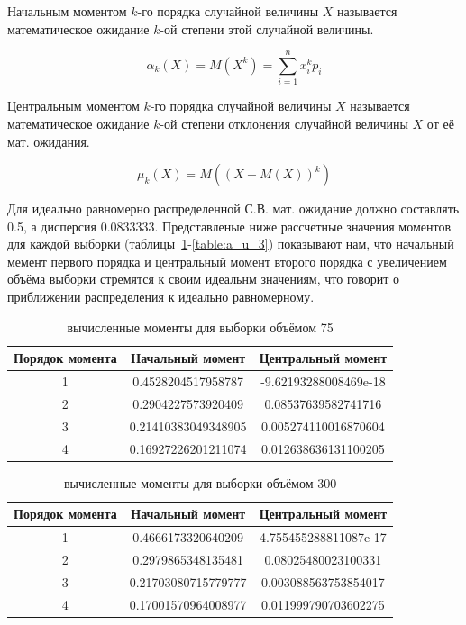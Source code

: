 \documentclass[a4paper,12pt]{article}
\begin{document}
Начальным моментом $k$-го порядка случайной величины $X$ называется математическое ожидание $k$-ой степени этой случайной величины.

{\large $$\alpha_k(X) = M(X^k) = \sum\limits_{i=1}^n x_i^k p_i$$}

Центральным моментом $k$-го порядка случайной величины $X$ называется математическое ожидание $k$-ой степени отклонения случайной величины $X$ от её мат. ожидания.

{\large $$\mu_k(X) = M\left(\left(X-M\left(X\right)\right)^k\right)$$}

Для идеально равномерно распределенной С.В. мат. ожидание должно составлять 0.5, а дисперсия 0.0833333. Представленые ниже рассчетные значения моментов для каждой выборки (таблицы~\ref{table:a_u_1}-\ref{table:a_u_3}) показывают нам, что начальный мемент первого порядка и центральный момент второго порядка с увеличением объёма выборки стремятся к своим идеальнм значениям, что говорит о приближении распределения к идеально равномерному.

\begin{table}[h]
	\caption{вычисленные моменты для выборки объёмом 75}
	\begin{tabular}{|c|c|c|}
	\hline 
	Порядок момента & Начальный момент & Центральный момент \\ 
	\hline 
	1 & 0.4528204517958787 & -9.62193288008469e-18 \\ 
	\hline 
	2 & 0.2904227573920409 & 0.08537639582741716 \\ 
	\hline 
	3 & 0.21410383049348905 & 0.005274110016870604 \\ 
	\hline 
	4 & 0.16927226201211074 & 0.012638636131100205 \\ 
	\hline 
	\end{tabular} 

	\label{table:a_u_1}
\end{table}

\begin{table}[h]
	\caption{вычисленные моменты для выборки объёмом 300}
	\begin{tabular}{|c|c|c|}
	\hline 
	Порядок момента & Начальный момент & Центральный момент \\ 
	\hline 
	1 & 0.4666173320640209 & 4.755455288811087e-17 \\ 
	\hline 
	2 & 0.2979865348135481 & 0.08025480023100331 \\ 
	\hline 
	3 & 0.21703080715779777 & 0.003088563753854017 \\ 
	\hline 
	4 & 0.17001570964008977 & 0.011999790703602275 \\ 
	\hline 
	\end{tabular} 

	\label{table:a_u_2}
\end{table}
\end{document}
